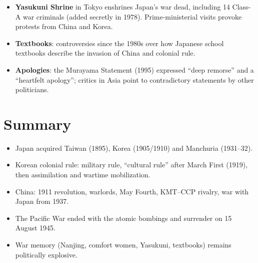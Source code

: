\begin{center}
\end{center}

\begin{itemize}
  \item \textbf{Yasukuni Shrine} in Tokyo enshrines Japan's war dead, including 14 Class-A war
        criminals (added secretly in 1978). Prime-ministerial visits provoke protests from
        China and Korea.
  \item \textbf{Textbooks}: controversies since the 1980s over how Japanese school textbooks
        describe the invasion of China and colonial rule.
  \item \textbf{Apologies}: the Murayama Statement (1995) expressed ``deep remorse'' and a
        ``heartfelt apology''; critics in Asia point to contradictory statements by other
        politicians.
\end{itemize}

\section*{Summary}
\begin{itemize}
  \item Japan acquired Taiwan (1895), Korea (1905/1910) and Manchuria (1931--32).
  \item Korean colonial rule: military rule, ``cultural rule'' after March First (1919),
        then assimilation and wartime mobilization.
  \item China: 1911 revolution, warlords, May Fourth, KMT--CCP rivalry, war with Japan from
        1937.
  \item The Pacific War ended with the atomic bombings and surrender on 15 August 1945.
  \item War memory (Nanjing, comfort women, Yasukuni, textbooks) remains politically
        explosive.
\end{itemize}
